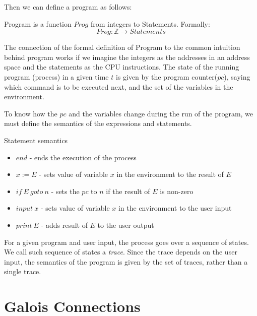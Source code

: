 Then we can define a program as follows:

\begin{defn}[Program]
    Program is a function $Prog$ from integers to Statements.
    Formally:
    \[Prog: \mathbb{Z} \rightarrow Statements\]
\end{defn}

The connection of the formal definition of Program to the common intuition behind program works if we imagine the
integers as the addresses in an address space and the statements as the CPU instructions.
The state of the running program (process) in a given time $t$ is given by the program counter($pc$), saying which
command is to be executed next, and the set of the variables in the environment.

To know how the $pc$ and the variables change during the run of the program, we must define the semantics of the
expressions and statements.

\begin{defn}
\end{defn}

\begin{defn} Statement semantics
    \begin{itemize}
        \item $end$ - ends the execution of the process
        \item $x := E$ - sets value of variable $x$ in the environment to the result of $E$
        \item $if \: E \: goto \: n$ - sets the $pc$ to $n$ if the result of $E$ is non-zero
        \item $input \: x$ - sets value of variable $x$ in the environment to the user input
        \item $print \: E$ - adds result of $E$ to the user output
    \end{itemize}
\end{defn}

For a given program and user input, the process goes over a sequence of states.
We call such sequence of states a \textit{trace}.
Since the trace depends on the user input, the semantics of the program is given by the set of traces, rather than
a single trace.



\section{Galois Connections} %


